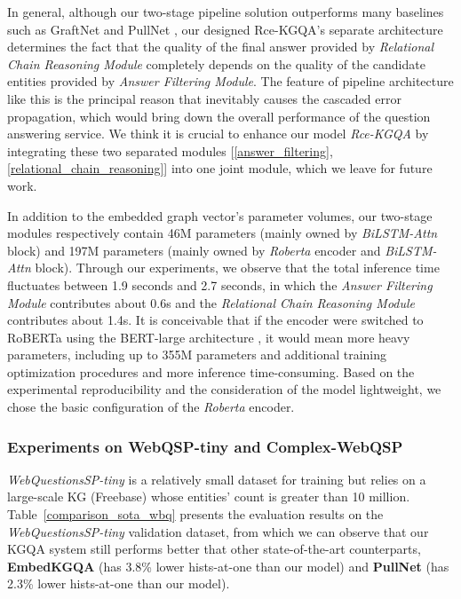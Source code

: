 \documentclass[pdflatex,sn-mathphys]{sn-jnl}%
\theoremstyle{thmstyleone}%
\theoremstyle{thmstyletwo}%
\theoremstyle{thmstylethree}%
\begin{document}

In general, although our two-stage pipeline solution outperforms many baselines such as GraftNet and PullNet \cite{sun2018graftnet,pullnet}, our designed Rce-KGQA's separate architecture determines the fact that the quality of the final answer provided by \textit{Relational Chain Reasoning Module} completely depends on the quality of the candidate entities provided by \textit{Answer Filtering Module}. The feature of pipeline architecture like this is the principal reason that inevitably causes the cascaded error propagation, which would bring down the overall performance of the question answering service. We think it is crucial to enhance our model \textit{Rce-KGQA} by integrating these two separated modules [\ref{answer_filtering}, \ref{relational_chain_reasoning}] into one joint module, which we leave for future work. %

In addition to the embedded graph vector's parameter volumes, our two-stage modules respectively contain 46M parameters (mainly owned by \textit{BiLSTM-Attn} block) and 197M parameters (mainly owned by \textit{Roberta} encoder and \textit{BiLSTM-Attn} block). Through our experiments, we observe that the total inference time fluctuates between 1.9 seconds and 2.7 seconds, in which the \textit{Answer Filtering Module} contributes about 0.6s and the \textit{Relational Chain Reasoning Module} contributes about 1.4s. It is conceivable that if the encoder were switched to RoBERTa using the BERT-large architecture \cite{ott2019fairseq,roberta}, it would mean more heavy parameters, including up to 355M parameters and additional training optimization procedures and more inference time-consuming. Based on the experimental reproducibility and the consideration of the model lightweight, we chose the basic configuration of the \textit{Roberta} encoder.

\subsubsection{Experiments on WebQSP-tiny and Complex-WebQSP} %
\textit{WebQuestionsSP-tiny} \cite{pmlrv162das22a,he2021stu-teaQA,apoorv2020embedKGQA} is a relatively small dataset for training but relies on a large-scale KG (Freebase) whose entities' count is greater than 10 million. Table~\ref{comparison_sota_wbq} presents the evaluation results on the \textit{WebQuestionsSP-tiny} validation dataset, from which we can observe that our KGQA system still performs better that other state-of-the-art counterparts, \textbf{EmbedKGQA} (has 3.8\% lower hists-at-one than our model) and \textbf{PullNet} (has 2.3\% lower hists-at-one than our model). 
\end{document}
